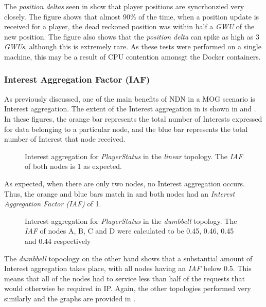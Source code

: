 The \textit{position deltas} seen in  show that player positions are syncrhonzied very closely. The figure shows that almost 90\% of the time, when a position update is received for a player, the dead reckoned position was within half a \textit{GWU} of the new position. The figure also shows that the \textit{position delta} can spike as high as 3 \textit{GWUs}, although this is extremely rare. As these tests were performed on a single machine, this may be a result of CPU contention amonsgt the Docker containers.



\subsubsection*{Interest Aggregation Factor (IAF)}
As previously discussed, one of the main benefits of NDN in a MOG scenario is Interest aggregation. The extent of the Interest aggregation in \game{} is shown in  and . In these figures, the orange bar represents the total number of Interests expressed for data belonging to a particular node, and the blue bar represents the total number of Interest that node received. 

\begin{figure}[H]
    \centering
    \caption{Interest aggregation for \textit{PlayerStatus} in the \textit{linear} topology. The \textit{IAF} of both nodes is 1 as expected.}
    \label{fig:eval:basic:interest-agg-linear}
\end{figure}

As expected, when there are only two nodes, no Interest aggregation occurs. Thus, the orange and blue bars match in  and both nodes had an \textit{Interest Aggregation Factor (IAF)} of 1.

\begin{figure}[H]
    \centering
    \caption{Interest aggregation for \textit{PlayerStatus} in the \textit{dumbbell} topology. The \textit{IAF} of nodes A, B, C and D were calculated to be 0.45, 0.46, 0.45 and 0.44 respectively}
    \label{fig:eval:basic:interest-agg-dumbbell}
\end{figure}


The \textit{dumbbell} topoology on the other hand shows that a substantial amount of Interest aggregation takes place, with all nodes having an \textit{IAF} below 0.5. This means that all of the nodes had to service less than half of the requests that would otherwise be required in IP. Again, the other topologies performed very similarly and the graphs are provided in .

